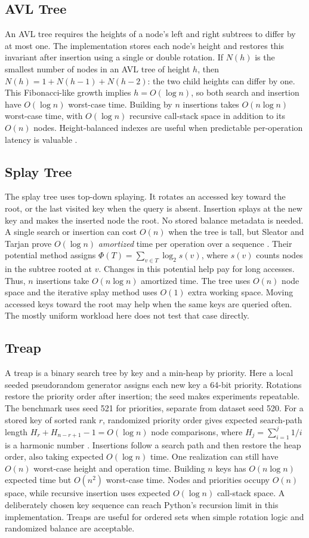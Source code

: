 \documentclass[acmsmall,nonacm]{acmart}
\begin{document}
\subsection{AVL Tree}
An AVL tree requires the heights of a node's left and right subtrees to differ by at most one. The implementation stores each node's height and restores this invariant after insertion using a single or double rotation. If $N(h)$ is the smallest number of nodes in an AVL tree of height $h$, then $N(h)=1+N(h-1)+N(h-2)$: the two child heights can differ by one. This Fibonacci-like growth implies $h=O(\log n)$, so both search and insertion have $O(\log n)$ worst-case time. Building by $n$ insertions takes $O(n\log n)$ worst-case time, with $O(\log n)$ recursive call-stack space in addition to its $O(n)$ nodes. Height-balanced indexes are useful when predictable per-operation latency is valuable \cite{nistavl,mitavl}.

\subsection{Splay Tree}
The splay tree uses top-down splaying. It rotates an accessed key toward the root, or the last visited key when the query is absent. Insertion splays at the new key and makes the inserted node the root. No stored balance metadata is needed. A single search or insertion can cost $O(n)$ when the tree is tall, but Sleator and Tarjan prove $O(\log n)$ \emph{amortized} time per operation over a sequence \cite{sleator1985}. Their potential method assigns $\Phi(T)=\sum_{v\in T}\log_2 s(v)$, where $s(v)$ counts nodes in the subtree rooted at $v$. Changes in this potential help pay for long accesses. Thus, $n$ insertions take $O(n\log n)$ amortized time. The tree uses $O(n)$ node space and the iterative splay method uses $O(1)$ extra working space. Moving accessed keys toward the root may help when the same keys are queried often. The mostly uniform workload here does not test that case directly.

\subsection{Treap}
A treap is a binary search tree by key and a min-heap by priority. Here a local seeded pseudorandom generator assigns each new key a 64-bit priority. Rotations restore the priority order after insertion; the seed makes experiments repeatable. The benchmark uses seed 521 for priorities, separate from dataset seed 520. For a stored key of sorted rank $r$, randomized priority order gives expected search-path length $H_r+H_{n-r+1}-1=O(\log n)$ node comparisons, where $H_j=\sum_{i=1}^{j}1/i$ is a harmonic number \cite{seidel1996}. Insertions follow a search path and then restore the heap order, also taking expected $O(\log n)$ time. One realization can still have $O(n)$ worst-case height and operation time. Building $n$ keys has $O(n\log n)$ expected time but $O(n^2)$ worst-case time. Nodes and priorities occupy $O(n)$ space, while recursive insertion uses expected $O(\log n)$ call-stack space. A deliberately chosen key sequence can reach Python's recursion limit in this implementation. Treaps are useful for ordered sets when simple rotation logic and randomized balance are acceptable.
\end{document}
